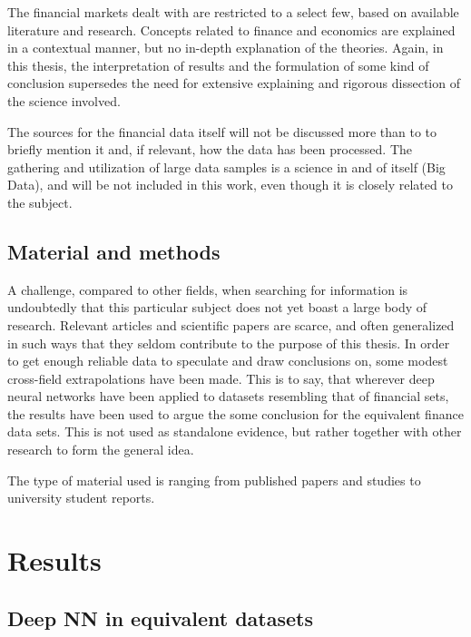 The financial markets dealt with are restricted to a select few, based on available literature and research. Concepts related to finance and economics are explained in a contextual manner, but no in-depth explanation of the theories. Again, in this thesis, the interpretation of results and the formulation of some kind of conclusion supersedes the need for extensive explaining and rigorous dissection of the science involved.

The sources for the financial data itself will not be discussed more than to to briefly mention it and, if relevant, how the data has been processed. The gathering and utilization of large data samples is a science in and of itself (Big Data), and will be not included in this work, even though it is closely related to the subject.


\subsection{Material and methods}


A challenge, compared to other fields, when searching for information is undoubtedly that this particular subject does not yet boast a large body of research. Relevant articles and scientific papers are scarce, and often generalized in such ways that they seldom contribute to the purpose of this thesis. In order to get enough reliable data to speculate and draw conclusions on, some modest cross-field extrapolations have been made. This is to say, that wherever deep neural networks have been applied to datasets resembling that of financial sets, the results have been used to argue the some conclusion for the equivalent finance data sets. This is not used as standalone evidence, but rather together with other research to form the general idea.

The type of material used is ranging from published papers and studies to university student reports.



\newpage

\section{Results}
\subsection{Deep NN in equivalent datasets}


